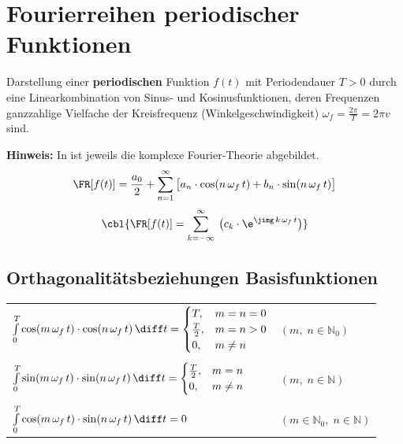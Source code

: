 \section{Fourierreihen periodischer Funktionen}

Darstellung einer \textbf{periodischen} Funktion $f(t)$ mit Periodendauer $T > 0$ durch eine Linearkombination von Sinus- und Kosinusfunktionen,
deren Frequenzen ganzzahlige Vielfache der Kreisfrequenz (Winkelgeschwindigkeit) $\omega_f = \frac{2 \pi}{T} = 2 \pi v$ sind. 


\smallskip

\textbf{Hinweis:} In  ist jeweils die komplexe Fourier-Theorie abgebildet.
\[\FR[f(t)] = \frac{a_0}{2} + \sum\limits _{n=1}^\infty \big[ a_n \cdot \cos(n \, \omega_f \, t) + b_n \cdot \sin(n \, \omega_f \, t) \big] \]
\[\cbl{\FR[f(t)] = \sum\limits _{k = -\infty}^\infty \: \big( c_k \cdot \e^{\jimg \, k \, \omega_f \, t} \big)} \]


\subsection{Orthagonalitätsbeziehungen Basisfunktionen}

\begin{tabular}{ll}
    $\int \limits_{0}^{T} \cos(m \, \omega_f \, t) \cdot \cos(n \, \omega_f \, t) \, \diff t = 
    \begin{cases}
        T,              & m = n = 0 \\
        \frac{T}{2},    & m = n > 0 \\
        0,              & m \neq n
    \end{cases}$ 
    & $(m, \; n \in \mathbb{N}_0)$ \\
    \\
    $\int \limits_{0}^{T} \sin(m \, \omega_f \, t) \cdot \sin(n \, \omega_f \, t) \, \diff t =      		
    \begin{cases}
        \frac{T}{2},    & m = n     \\
        0,              & m \neq n
    \end{cases} $ 
    & $(m, \; n \in \mathbb{N})$    \\
    \\
    $\int \limits_{0}^{T} \cos(m \, \omega_f \, t) \cdot \sin(n \, \omega_f \, t) \, \diff t = 0$ 	
    & $(m \in \mathbb{N}_0, \; n \in \mathbb{N})$ 
\end{tabular}


